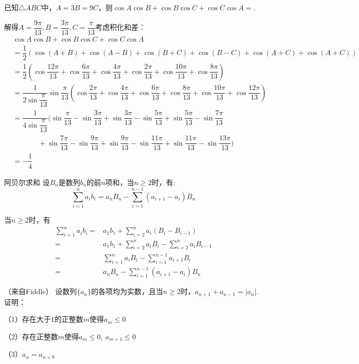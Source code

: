 \begin{example}{}{}
    已知$\triangle{ABC}$中，$A=3B=9C$，则$\cos A\cos B+\cos B\cos C+\cos C\cos A=$\underline{\hspace{1cm}}.
\end{example}
\begin{solution}
解得$A=\dfrac{9\pi}{13},B=\dfrac{3\pi}{13},C=\dfrac{\pi}{13}$考虑积化和差：
\begin{align*}
&\cos A\cos B+\cos B\cos C+\cos C\cos A\\
&=\dfrac12(\cos(A+B)+\cos(A-B)+\cos(B+C)+\cos(B-C)+\cos(A+C)+\cos(A+C))\\
&=\dfrac12(\cos\dfrac{12\pi}{13}+\cos\dfrac{6\pi}{13}+\cos\dfrac{4\pi}{13}+\cos\dfrac{2\pi}{13}+\cos\dfrac{10\pi}{13}+\cos\dfrac{8\pi}{13})\\
&=\dfrac{1}{2\sin\dfrac{\pi}{13}}\sin\dfrac{\pi}{13}(\cos\dfrac{2\pi}{13}+\cos\dfrac{4\pi}{13}+\cos\dfrac{6\pi}{13}+\cos\dfrac{8\pi}{13}+\cos\dfrac{10\pi}{13}+\cos\dfrac{12\pi}{13})\\
&=\dfrac{1}{4\sin\dfrac{\pi}{13}}(\sin\dfrac{\pi}{13}-\sin\dfrac{3\pi}{13}+\sin\dfrac{3\pi}{13}-\sin\dfrac{5\pi}{13}+\sin\dfrac{5\pi}{13}-\sin\dfrac{7\pi}{13}\\
&~~~~~~~~~~~~~~~~+\sin\dfrac{7\pi}{13}-\sin\dfrac{9\pi}{13}+\sin\dfrac{9\pi}{13}-\sin\dfrac{11\pi}{13}+\sin\dfrac{11\pi}{13}-\sin\dfrac{13\pi}{13})\\
&=-\dfrac14
\end{align*}
\end{solution}
\begin{theorem}{阿贝尔求和}{}
    设$B_n$是数列$b_n$的前$n$项和，当$n\ge 2$时，有:\vspace{-5pt}\[
    \sum_{i=1}^na_ib_i=a_nB_n-\sum_{i=1}^{n-1}(a_{i+1}-a_i)B_n\]
\end{theorem}
\begin{myproof}
    当$n\ge 2$时，有
    \begin{align*}
        \sum_{i=1}^na_ib_i=&a_1b_1+\sum_{i=2}^{n}a_i(B_i-B_{i-1})\\
        =&a_1b_1+\sum_{i=2}^{n}a_iB_i-\sum_{i=2}^{n}a_iB_{i-1}\\
        =&\sum_{i=1}^{n}a_iB_i-\sum_{i=1}^{n-1}a_{i+1}B_i\\
        =&a_nB_n-\sum_{i=1}^{n-1}(a_{i+1}-a_i)B_n
    \end{align*}
\end{myproof}
\begin{example}{（来自Fiddle）}{}
    设数列$\{a_n\}$的各项均为实数，且当$n\ge 2$时，$a_{n+1}+a_{n-1}=|a_n|$.证明：

    （1）存在大于$1$的正整数$m$使得$a_m\le 0$

    （2）存在正整数$m$使得$a_m\le 0,~a_{m+1}\le 0$

    （3）$a_n=a_{n+9}$ 
\end{example}
